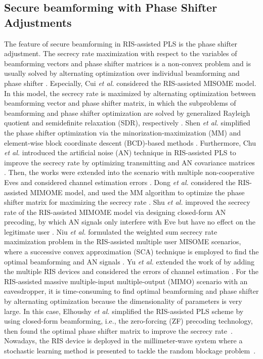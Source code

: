 \documentclass[journal]{IEEEtran}
\theoremstyle{definition}
\begin{document}
\subsection{Secure beamforming with Phase Shifter Adjustments}
The feature of secure beamforming in RIS-assisted PLS is the phase shifter adjustment. The secrecy rate maximization with respect to the variables of beamforming vectors and phase shifter matrices is a non-convex problem and is usually solved by alternating optimization over individual beamforming and phase shifter \cite{Miao2019, Hong2019, Qiao2020, Feng2020 ,Zheng2021, HongAN2020 , Dong2020, HongRobust2021, Niu2021, Shu2021, Elhoushy2021,Yu2020}. Especially, Cui \textsl{et al.} considered the RIS-assisted MISOME model. In this model, the secrecy rate is maximized by alternating optimization between beamforming vector and phase shifter matrix, in which the subproblems of beamforming and phase shifter optimization are solved by generalized Rayleigh quotient and semidefinite relaxation (SDR), respectively \cite{Miao2019}. Shen \textsl{et al.} simplified the phase shifter optimization via the minorization-maximization (MM) \cite{Hong2019} and element-wise block coordinate descent (BCD)-based methods \cite{Qiao2020}.  Furthermore, Chu \textsl{et al.} introduced the artificial noise (AN) technique in RIS-assisted PLS to improve the secrecy rate by optimizing  transmitting and AN covariance matrices \cite{HongAN2020, Zheng2021}. Then, the works \cite{HongAN2020, Zheng2021} were extended into the scenario with multiple non-cooperative Eves and considered channel estimation errors \cite{HongRobust2021}.  Dong \textsl{et al.} considered the RIS-assisted MIMOME model, and used the MM algorithm to optimize the phase shifter matrix for maximizing the secrecy rate \cite{Dong2020}. Shu \textsl{et al.} improved the secrecy rate of the RIS-assisted MIMOME model via designing closed-form AN precoding, by which AN signals only interfere with Eve but have no effect on the legitimate user \cite{Shu2021}. Niu  \textsl{et al.} formulated the weighted sum secrecy rate maximization problem in the RIS-assisted multiple user MISOME scenarios, where a successive convex approximation (SCA) technique is employed to find the optimal beamforming and AN signals \cite{Niu2021}. Yu \textsl{et al.} extended the work of \cite{Niu2021} by adding the multiple RIS devices and considered the errors of channel estimation \cite{Yu2020}. For the RIS-assisted massive multiple-input multiple-output (MIMO) scenario with an eavesdropper, it is time-consuming to find optimal beamforming and phase shifter by alternating optimization because the dimensionality of parameters is very large. In this case, Elhoushy \textsl{et al.} simplified the RIS-assisted PLS scheme by using closed-form beamforming, i.e.,  the zero-forcing (ZF) precoding technology, then found the optimal  phase shifter matrix to improve the secrecy rate~\cite{Elhoushy2021}. Nowadays, the RIS device is deployed in the millimeter-wave system where a stochastic learning method is presented to tackle the random blockage problem~\cite{Zhou2021}. 
\end{document}
